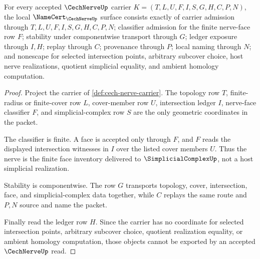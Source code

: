 \begin{theorem}
\label{thm:cech-nerve-namecert-obligations}
For every accepted $\CechNerveUp$ carrier $K=(T,L,U,F,I,S,G,H,C,P,N)$, the local $\NameCert_{\CechNerveUp}$ surface consists exactly of carrier admission through $T,L,U,F,I,S,G,H,C,P,N$; classifier admission for the finite nerve-face row $F$; stability under componentwise transport through $G$; ledger exposure through $I,H$; replay through $C$; provenance through $P$; local naming through $N$; and nonescape for selected intersection points, arbitrary subcover choice, host nerve realizations, quotient simplicial equality, and ambient homology computation.
\end{theorem}
\begin{proof}
Project the carrier of \autoref{def:cech-nerve-carrier}. The topology row $T$, finite-radius or finite-cover row $L$, cover-member row $U$, intersection ledger $I$, nerve-face classifier $F$, and simplicial-complex row $S$ are the only geometric coordinates in the packet.

The classifier is finite. A face is accepted only through $F$, and $F$ reads the displayed intersection witnesses in $I$ over the listed cover members $U$. Thus the nerve is the finite face inventory delivered to $\SimplicialComplexUp$, not a host simplicial realization.

Stability is componentwise. The row $G$ transports topology, cover, intersection, face, and simplicial-complex data together, while $C$ replays the same route and $P,N$ source and name the packet.

Finally read the ledger row $H$. Since the carrier has no coordinate for selected intersection points, arbitrary subcover choice, quotient realization equality, or ambient homology computation, those objects cannot be exported by an accepted $\CechNerveUp$ read.
\end{proof}



